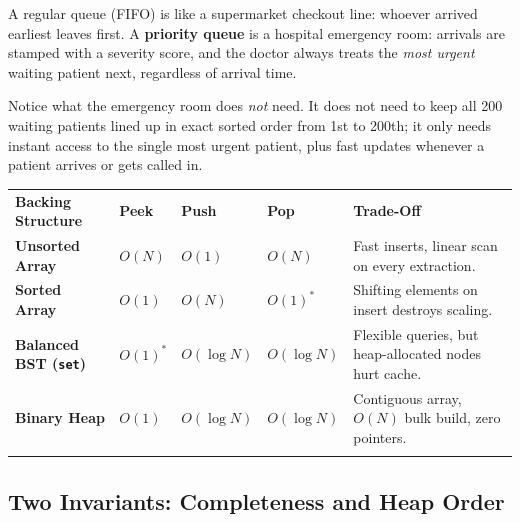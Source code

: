 \documentclass[11pt,a4paper]{article}
\theoremstyle{definition}
\begin{document}
A regular queue (FIFO) is like a supermarket checkout line: whoever arrived earliest leaves first. A \textbf{priority queue} is a hospital emergency room: arrivals are stamped with a severity score, and the doctor always treats the \emph{most urgent} waiting patient next, regardless of arrival time.

Notice what the emergency room does \emph{not} need. It does not need to keep all 200 waiting patients lined up in exact sorted order from 1st to 200th; it only needs instant access to the single most urgent patient, plus fast updates whenever a patient arrives or gets called in.

\begingroup\small{}
\begin{tabularx}{\textwidth}{>{\raggedright\arraybackslash\bfseries}p{3.4cm} >{\centering\arraybackslash}p{1.8cm} >{\centering\arraybackslash}p{1.8cm} >{\centering\arraybackslash}p{1.8cm} >{\raggedright\arraybackslash}X}
\arrayrulecolor{primaryblue}\toprule[1.2pt]
\rowcolor{primaryblue!10}
\textcolor{primaryblue}{\textbf{Backing Structure}} & \textcolor{primaryblue}{\textbf{Peek}} & \textcolor{primaryblue}{\textbf{Push}} & \textcolor{primaryblue}{\textbf{Pop}} & \textcolor{primaryblue}{\textbf{Trade-Off}} \\
\arrayrulecolor{codeframe}\midrule[0.6pt]
Unsorted Array & $O(N)$ & $O(1)$ & $O(N)$ & Fast inserts, linear scan on every extraction. \\
Sorted Array & $O(1)$ & $O(N)$ & $O(1)^*$ & Shifting elements on insert destroys scaling. \\
Balanced BST (\texttt{set}) & $O(1)^*$ & $O(\log N)$ & $O(\log N)$ & Flexible queries, but heap-allocated nodes hurt cache. \\
Binary Heap & $O(1)$ & $O(\log N)$ & $O(\log N)$ & Contiguous array, $O(N)$ bulk build, zero pointers. \\
\arrayrulecolor{primaryblue}\bottomrule[1.2pt]
\end{tabularx}\endgroup

\par{}

\subsection{Two Invariants: Completeness and Heap Order}
\end{document}
